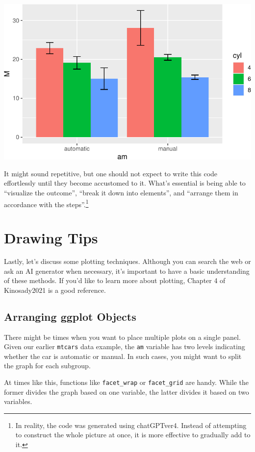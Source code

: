 \documentclass[
  a4paper,
]{book}
\begin{document}
\includegraphics{chapter04_files/figure-pdf/withHandlingGGplot-1.pdf}

It might sound repetitive, but one should not expect to write this code
effortlessly until they become accustomed to it. What's essential is
being able to ``visualize the outcome'', ``break it down into
elements'', and ``arrange them in accordance with the
steps''.\footnote{In reality, the code was generated using chatGPTver4.
  Instead of attempting to construct the whole picture at once, it is
  more effective to gradually add to it.}

\section{Drawing Tips}\label{drawing-tips}

Lastly, let's discuss some plotting techniques. Although you can search
the web or ask an AI generator when necessary, it's important to have a
basic understanding of these methods. If you'd like to learn more about
plotting, Chapter 4 of Kinosady2021 is a good reference.

\subsection{Arranging ggplot Objects}\label{arranging-ggplot-objects}

There might be times when you want to place multiple plots on a single
panel. Given our earlier \texttt{mtcars} data example, the \texttt{am}
variable has two levels indicating whether the car is automatic or
manual. In such cases, you might want to split the graph for each
subgroup.

At times like this, functions like \texttt{facet\_wrap} or
\texttt{facet\_grid} are handy. While the former divides the graph based
on one variable, the latter divides it based on two variables.
\end{document}
